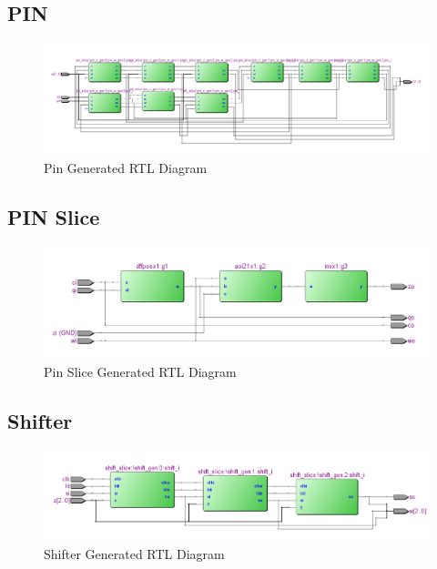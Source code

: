 \documentclass{article}
\begin{document}
    \subsection{PIN}
        
        \begin{figure}[H]
            \centering
            \includegraphics[width=0.5\linewidth]{../../doc/rtl_pics/pin_rtl.png}
            \caption{Pin Generated RTL Diagram}
        \end{figure}
    \subsection{PIN Slice}
        
        \begin{figure}[H]
            \centering
            \includegraphics[width=\linewidth]{../../doc/rtl_pics/pin_slice_rtl.png}
            \caption{Pin Slice Generated RTL Diagram}
        \end{figure}
    \newpage
    \subsection{Shifter}
        
        \begin{figure}[H]
            \centering
            \includegraphics[width=\linewidth]{../../doc/rtl_pics/shift_rtl.png}
            \caption{Shifter Generated RTL Diagram}
        \end{figure}
    \newpage
\end{document}

